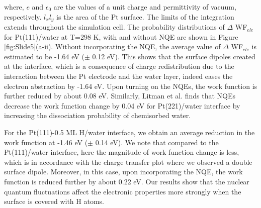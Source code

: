 \noindent where, $e$ and $\epsilon_0$ are the values of a unit charge and
permittivity of vacuum, respectively. $l_xl_y$ is the area of the Pt surface. The limits of the integration 
extends throughout the simulation cell. The probability distributions
of $\Delta$ WF$_{ele}$ for Pt(111)/water at T=298 K, with and without NQE 
are shown in Figure \ref{fig:Slide5}(a-ii). Without incorporating
the NQE, the average value of $\Delta$ WF$_{ele}$ is estimated to
be -1.64 eV ($\pm$ 0.12 eV). 
This shows that the surface dipoles created at the interface, which
is a consequence of charge redistribution due to the interaction
between the Pt electrode and the water layer, indeed eases the electron abstraction by -1.64 eV. Upon turning on the NQEs, the work function is further reduced by about 0.08 eV. Similarly, Litman et al.\cite{litman2018decisive} finds that NQEs decrease the work function change by 0.04 eV for Pt(221)/water interface by increasing the dissociation probability of chemisorbed water.

For the Pt(111)-0.5 ML H/water interface, we obtain an average reduction
in the work function at -1.46 eV ($\pm$ 0.14 eV). We note that compared to the
Pt(111)/water interface, here the magnitude of work function change
is less, which is in accordance with the charge transfer plot where we
observed a double surface dipole. Moreover, in this case, upon incorporating
the NQE, the work function is reduced further by about 0.22 eV.
Our results show that the nuclear quantum fluctuations affect the
electronic properties more strongly when the surface is covered
with H atoms.



